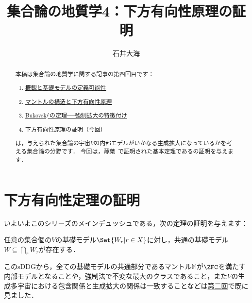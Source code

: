 \documentclass[a4j,leqno]{ltjsarticle}
\title{集合論の地質学4：下方有向性原理の証明}
\author{石井大海}
\renewcommand{\emph}[1]{\textgt{\textsf{#1}}}
\newcommand{\mantle}{\mathbb{M}}
\newcommand{\M}{\mantle}
\newcommand{\sDDG}{\mathord{\mathrm{sDDG}}}
\begin{document}
\maketitle

\begin{abstract}
 本稿は集合論の地質学に関する記事の第四回目です：
 \begin{enumerate}[label={\arabic*.}]
  \item \href{http://konn-san.com/math/geology-ground-definability.html}{概観と基礎モデルの定義可能性}
  \item \href{http://konn-san.com/math/geology-mantle-and-ddg.html}{マントルの構造と下方有向性原理}
  \item \href{http://konn-san.com/math/geology-bukovsky-theorem.html}{Bukovsk\'{y}の定理──強制拡大の特徴付け}
  \item 下方有向性原理の証明（今回）
 \end{enumerate} 
 \emph{集合論の地質学}は，与えられた集合論の宇宙$V$の内部モデルがいかなる生成拡大になっているかを考える集合論の分野です．
 今回は，薄葉~\cite{Usuba:2017fp}で証明された基本定理である\emph{下方有向性原理}の証明を与えます．
\end{abstract}
\section{下方有向性定理の証明}
いよいよこのシリーズのメインデュッシュである，次の定理の証明を与えます：
\begin{theorem}
 任意の集合個の$V$の基礎モデル$\Set{W_r | r \in X}$に対し，共通の基礎モデル$W \subseteq \bigcap_r W_r$が存在する．
\end{theorem}
この$\sDDG$から，全ての基礎モデルの共通部分であるマントル$\M$が$\ZFC$を満たす内部モデルとなることや，強制法で不変な最大のクラスであること，また$V$の生成多宇宙における包含関係と生成拡大の関係は一致することなどは\href{http://konn-san.com/math/geology-mantle-and-ddg.html}{第二回}で既に見ました．
\end{document}
